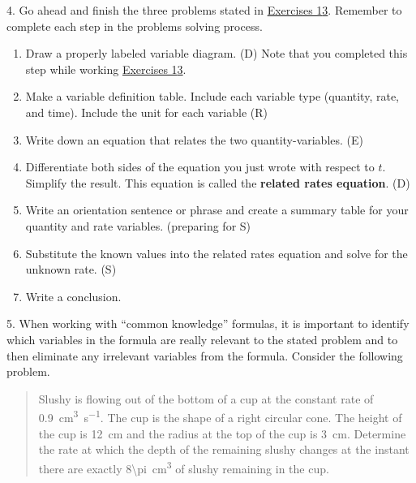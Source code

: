 \documentclass[10pt,oneside,]{book}
\newcommand{\terminology}[1]{\textbf{#1}}
\newcommand{\acronym}[1]{#1}
\theoremstyle{plain}
\theoremstyle{definition}
\numberwithin{equation}{section}
\begin{document}
\par\smallskip\noindent
\begin{exerciselist}
\item[4.]\hypertarget{exercise-553}{\null}Go ahead and finish the three problems stated in \hyperlink{exercise-triangle-first}{Exercises 1}\textendash{}\hyperlink{exercise-triangle-last}{3}. Remember to complete each step in the problems solving process.%
\begin{enumerate}[label=(\alph*)]
\item{}Draw a properly labeled variable diagram. (\acronym{D}) Note that you completed this step while working \hyperlink{exercise-triangle-first}{Exercises 1}\textendash{}\hyperlink{exercise-triangle-last}{3}.\item{}Make a variable definition table. Include each variable type (quantity, rate, and time). Include the unit for each variable (\acronym{R})\item{}Write down an equation that relates the two quantity-variables. (\acronym{E})\item{}Differentiate both sides of the equation you just wrote with respect to \(t\). Simplify the result. This equation is called the \terminology{related rates equation}. (\acronym{D})\item{}Write an orientation sentence or phrase and create a summary table for your quantity and rate variables. (preparing for \acronym{S})\item{}Substitute the known values into the related rates equation and solve for the unknown rate. (\acronym{S})\item{}Write a conclusion.\end{enumerate}
\par\smallskip
\item[5.]\hypertarget{exercise-554}{\null}When working with ``common knowledge'' formulas, it is important to identify which variables in the formula are really relevant to the stated problem and to then eliminate any irrelevant variables from the formula. Consider the following problem. \begin{quote}Slushy is flowing out of the bottom of a cup at the constant rate of \SI{0.9}{\centi\meter\tothe{3}\per\second}. The cup is the shape of a right circular cone. The height of the cup is \SI{12}{\centi\meter} and the radius at the top of the cup is \SI{3}{\centi\meter}. Determine the rate at which the depth of the remaining slushy changes at the instant there are exactly \SI{8\pi}{\centi\meter\tothe{3}} of slushy remaining in the cup.\end{quote}%

\end{exerciselist}
\end{document}
